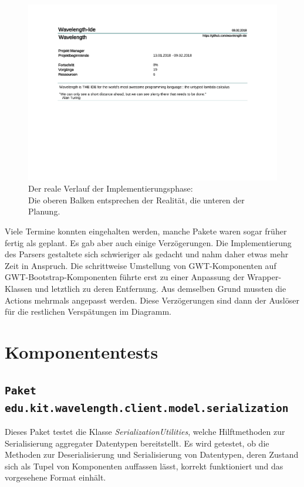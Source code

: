 \documentclass[parskip=full,11pt]{scrartcl}
\begin{document}
\begin{itemize}
\begin{figure}[H]
\hspace*{-2cm}
\includegraphics[trim={0, 7cm, 0, 0}, clip, scale=0.65, page=4]{Implementierungsplan/Implementierungsplan.pdf}
\caption[caption]{Der reale Verlauf der Implementierungsphase: \\\hspace{\textwidth}
Die oberen Balken entsprechen der Realität, die unteren der Planung.}
\end{figure}

Viele Termine konnten eingehalten werden, manche Pakete waren sogar früher fertig als geplant.
Es gab aber auch einige Verzögerungen.
Die Implementierung des Parsers gestaltete sich schwieriger als gedacht und nahm daher etwas mehr Zeit in Anspruch.
Die schrittweise Umstellung von GWT-Komponenten auf GWT-Bootstrap-Komponenten führte erst zu einer Anpassung der
Wrapper-Klassen und letztlich zu deren Entfernung.
Aus demselben Grund mussten die Actions mehrmals angepasst werden.
Diese Verzögerungen sind dann der Auslöser für die restlichen Verspätungen im Diagramm.

\newpage
\section{Komponententests}
\subsection{\texttt{Paket edu.kit.wavelength.client.model.serialization}}
Dieses Paket testet die Klasse \emph{SerializationUtilities}, welche Hilftmethoden zur Serialisierung aggregater Datentypen
bereitstellt. Es wird getestet, ob die Methoden zur Deserialisierung und Serialisierung von Datentypen, deren Zustand sich als Tupel
von Komponenten auffassen lässt, korrekt funktioniert und das vorgesehene Format einhält.


\end{itemize}
\end{document}
